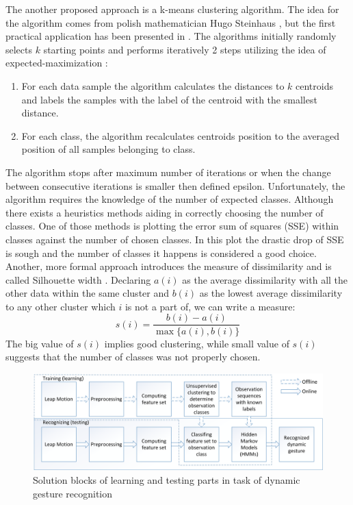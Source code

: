 The another proposed approach is a k-means clustering algorithm.
The idea for the algorithm comes from polish mathematician Hugo Steinhaus \cite{kmeans1}, but the first practical application has been presented in \cite{kmeans2}.
The algorithms initially randomly selects $k$ starting points and performs iteratively 2 steps utilizing the idea of expected-maximization \cite{expectedmaximization}:
\begin{enumerate}
\item For each data sample the algorithm calculates the distances to $k$ centroids and labels the samples with the label of the centroid with the smallest distance.
\item For each class, the algorithm recalculates centroids position to the averaged position of all samples belonging to class.
\end{enumerate} 
The algorithm stops after maximum number of iterations or when the change between consecutive iterations is smaller then defined epsilon.
Unfortunately, the algorithm requires the knowledge of the number of expected classes.
Although there exists a heuristics methods aiding in correctly choosing the number of classes. 
One of those methods is plotting the error sum of squares (SSE) within classes against the number of chosen classes. 
In this plot the drastic drop of SSE is sough and the number of classes it happens is considered a good choice.
Another, more formal approach introduces the measure of dissimilarity and is called Silhouette width \cite{silhouette}.
Declaring $a(i)$ as the average dissimilarity with all the other data within the same cluster and $b(i)$ as the lowest average dissimilarity to any other cluster which $i$ is not a part of, we can write a measure:
\begin{equation}
s(i) = \frac{b(i) - a(i)}{\max{\{a(i),b(i)}\}}
\end{equation}
The big value of $s(i)$ implies good clustering, while small value of $s(i)$ suggests that the number of classes was not properly chosen.





\begin{figure}[htb]
\centering
 \includegraphics[width=1\columnwidth]{figures/DynamicGestures.png}
 \caption{Solution blocks of learning and testing parts in task of dynamic gesture recognition}
 \label{dynamicgesturesflow}
\end{figure}

